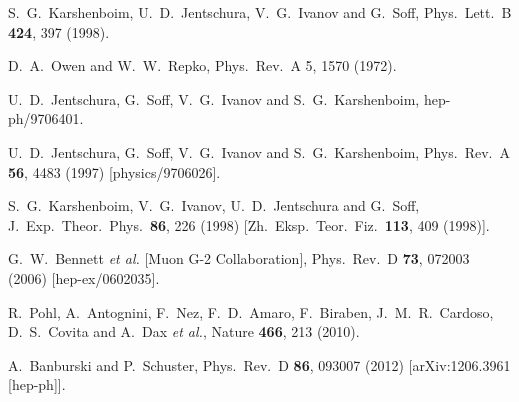   S.~G.~Karshenboim, U.~D.~Jentschura, V.~G.~Ivanov and G.~Soff,
  Phys.\ Lett.\ B {\bf 424}, 397 (1998).


  D.~A.~Owen and W.~W.~Repko, 
  Phys.\ Rev.\ A 5, 1570 (1972).                 


  U.~D.~Jentschura, G.~Soff, V.~G.~Ivanov and S.~G.~Karshenboim,
  hep-ph/9706401.

  U.~D.~Jentschura, G.~Soff, V.~G.~Ivanov and S.~G.~Karshenboim,
  Phys.\ Rev.\ A {\bf 56}, 4483 (1997)
  [physics/9706026].


  S.~G.~Karshenboim, V.~G.~Ivanov, U.~D.~Jentschura and G.~Soff,
  J.\ Exp.\ Theor.\ Phys.\  {\bf 86}, 226 (1998)
  [Zh.\ Eksp.\ Teor.\ Fiz.\  {\bf 113}, 409 (1998)].


  G.~W.~Bennett {\it et al.}  [Muon G-2 Collaboration],
  Phys.\ Rev.\ D {\bf 73}, 072003 (2006)
  [hep-ex/0602035].



  R.~Pohl, A.~Antognini, F.~Nez, F.~D.~Amaro, F.~Biraben, J.~M.~R.~Cardoso, D.~S.~Covita and A.~Dax {\it et al.},
  Nature {\bf 466}, 213 (2010).

  A.~Banburski and P.~Schuster,
  Phys.\ Rev.\ D {\bf 86}, 093007 (2012)
  [arXiv:1206.3961 [hep-ph]].



